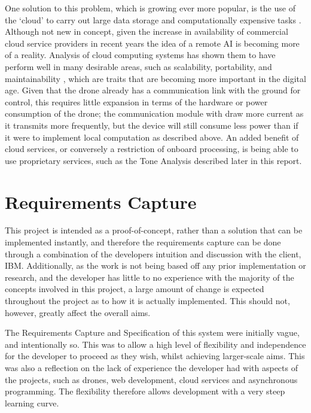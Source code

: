 \documentclass{article}
\begin{document}
One solution to this problem, which is growing ever more popular, is the use of the `cloud' to carry out large data storage and computationally expensive tasks \cite{CloudRobotics}. Although not new in concept, given the increase in availability of commercial cloud service providers in recent years the idea of a remote AI is becoming more of a reality. Analysis of cloud computing systems has shown them to have perform well in many desirable areas, such as scalability, portability, and maintainability \cite{SoftwareArchitecture}, which are traits that are becoming more important in the digital age. Given that the drone already has a communication link with the ground for control, this requires little expansion in terms of the hardware or power consumption of the drone; the communication module with draw more current as it transmits more frequently, but the device will still consume less power than if it were to implement local computation as described above. An added benefit of cloud services, or conversely a restriction of onboard processing, is being able to use proprietary services, such as the Tone Analysis described later in this report.



\section{Requirements Capture}
This project is intended as a proof-of-concept, rather than a solution that can be implemented instantly, and therefore the requirements capture can be done through a combination of the developers intuition and discussion with the client, IBM. Additionally, as the work is not being based off any prior implementation or research, and the developer has little to no experience with the majority of the concepts involved in this project, a large amount of change is expected throughout the project as to how it is actually implemented. This should not, however, greatly affect the overall aims.

The Requirements Capture and Specification of this system were initially vague, and intentionally so. This was to allow a high level of flexibility and independence for the developer to proceed as they wish, whilst achieving larger-scale aims. This was also a reflection on the lack of experience the developer had with aspects of the projects, such as drones, web development, cloud services and asynchronous programming. The flexibility therefore allows development with a very steep learning curve.
\end{document}
